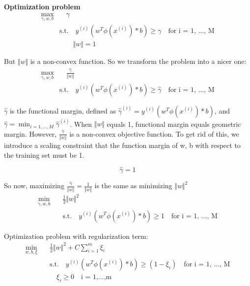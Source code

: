 \documentclass[11pt]{article}
\begin{document}
\textbf{Optimization problem}
\begin{equation}
\begin{split}
\max_{\gamma, w,b} & \quad \gamma \\
&\textrm{s.t.} \quad y^{(i)}(w^T \phi (x^{(i)}) * b) \geq \gamma \quad \textrm{for i = 1, ..., M} \\
&\quad \quad \Vert w \Vert = 1
\end{split}
\end{equation}

But $\Vert w \Vert$ is a non-convex function. So we transform the problem into a nicer one:
\begin{equation}
\begin{split}
\max_{\gamma, w,b} & \quad \frac{\hat{\gamma}}{\Vert w \Vert} \\
&\textrm{s.t.} \quad y^{(i)}(w^T \phi(x^{(i)}) * b) \geq \hat{\gamma} \quad \textrm{for i = 1, ..., M} 
\end{split}
\end{equation}

$\hat{\gamma}$ is the functional margin, defined as $\hat{\gamma}^{(i)} = y^{(i)}(w^T \phi (x^{(i)}) * b)$, and $\hat{\gamma} = \min_{i = 1,..., M} \hat{\gamma}^{(i)}$. When $\Vert w \Vert$ equals 1, functional margin equals geometric margin.  However, $\frac{\hat{\gamma}}{\Vert w \Vert}$ is a non-convex objective function. To get rid of this, we introduce a scaling constraint that the function margin of w, b with respect to the training set must be 1. 

$$\hat{\gamma} = 1$$

So now, maximizing  $\frac{\hat{\gamma}}{\Vert w \Vert} = \frac{1}{\Vert w \Vert}$ is the same as minimizing ${\Vert w \Vert}^{2}$
\begin{equation}
\begin{split}
\min_{\gamma, w, b} & \quad \frac{1}{2} {\Vert w \Vert}^{2} \\
&\quad \textrm{s.t.}  \quad y^{(i)}(w^T \phi (x^{(i)}) * b) \geq 1 \quad \textrm{for i = 1, ..., M}
\end{split}
\end{equation}

Optimization problem with regularization term:
\begin{equation}
\begin{split}
\min_{w, b, \xi} & \quad \frac{1}{2} {\Vert w \Vert}^{2} + C \sum_{i= 1}^{m} \xi_{i}\\
&\quad \textrm{s.t.}  \quad y^{(i)}(w^T \phi (x^{(i)}) * b) \geq (1 - \xi_{i}) \quad \textrm{for i = 1, ..., M}\\
&\quad \quad {\xi}_{i} \geq 0 \quad \textrm{i = 1,...,m}
\end{split}
\end{equation}
\end{document}
